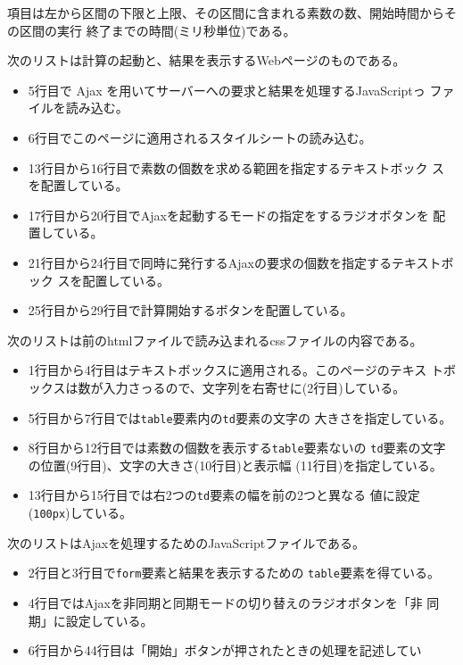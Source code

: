 \begin{Exec}
 項目は左から区間の下限と上限、その区間に含まれる素数の数、開始時間からその区間の実行
 終了までの時間(ミリ秒単位)である。
 
 次のリストは計算の起動と、結果を表示するWebページのものである。
 \begin{itemize}
  \item 5行目で Ajax を用いてサーバーへの要求と結果を処理するJavaScriptっ
        ファイルを読み込む。
  \item 6行目でこのページに適用されるスタイルシートの読み込む。
  \item 13行目から16行目で素数の個数を求める範囲を指定するテキストボック
        スを配置している。
  \item 17行目から20行目でAjaxを起動するモードの指定をするラジオボタンを
        配置している。
  \item 21行目から24行目で同時に発行するAjaxの要求の個数を指定するテキストボック
        スを配置している。
  \item 25行目から29行目で計算開始するボタンを配置している。
 \end{itemize}
 次のリストは前のhtmlファイルで読み込まれるcssファイルの内容である。
 \begin{itemize}
  \item 1行目から4行目はテキストボックスに適用される。このページのテキス
        トボックスは数が入力さっるので、文字列を右寄せに(2行目)している。
  \item 5行目から7行目では\texttt{table}要素内の\texttt{td}要素の文字の
        大きさを指定している。 
  \item 8行目から12行目では素数の個数を表示する\texttt{table}要素ないの
        \texttt{td}要素の文字の位置(9行目)、文字の大きさ(10行目)と表示幅
        (11行目)を指定している。
  \item 13行目から15行目では右2つの\texttt{td}要素の幅を前の2つと異なる
        値に設定(\texttt{100px})している。
 \end{itemize}
 次のリストはAjaxを処理するためのJavaScriptファイルである。
 \begin{itemize}
  \item 2行目と3行目で\texttt{form}要素と結果を表示するための
        \texttt{table}要素を得ている。
  \item 4行目ではAjaxを非同期と同期モードの切り替えのラジオボタンを「非
        同期」に設定している。
  \item 6行目から44行目は「開始」ボタンが押されたときの処理を記述してい

\end{itemize}
\end{Exec}

